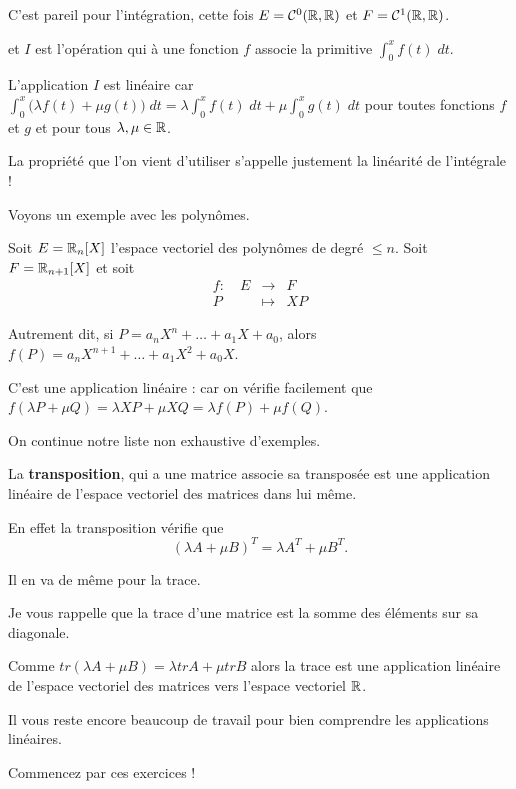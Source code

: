 \change

C'est pareil pour l'intégration, cette fois 
 $E = \mathcal{C}^0(\mathbb{R},\mathbb{R})$ et $F = \mathcal{C}^1(\mathbb{R},\mathbb{R})$. 

et $I$ est l'opération qui à une fonction $f$ associe
la primitive $\int_0^x f(t) \; dt$.


L'application $I$ est linéaire car 
$\int_0^x \big(\lambda f(t) + \mu g(t)\big) \; dt 
= \lambda \int_0^x f(t) \; dt + \mu \int_0^x g(t) \; dt$  
pour toutes fonctions $f$ et $g$ et pour tous $\lambda,\mu \in \mathbb{R}$.
 
La propriété que l'on vient d'utiliser s'appelle justement la linéarité de l'intégrale !

\change

Voyons un exemple avec les polynômes.



Soit $E=\mathbb{R}_n[X]$ l'espace vectoriel des polynômes de degré $\le n$.
Soit $F = \mathbb{R}_{n+1}[X]$ et soit 
$$\begin{array}{rcl}
f : \quad E & \longrightarrow & F \\
P & \longmapsto & X P
  \end{array}$$
  
Autrement dit, si $P = a_n X^n + \dots + a_1 X + a_0$,
alors $f(P) =  a_n X^{n+1} + \dots + a_1 X^2 + a_0 X$.

C'est une application linéaire : car on vérifie facilement que 
$f(\lambda P+ \mu Q) = \lambda X P + \mu X Q = \lambda f(P) + \mu f(Q)$.


\diapo

On continue notre liste non exhaustive d'exemples.


La \textbf{transposition}, qui a une matrice associe sa transposée est une application linéaire
de l'espace vectoriel des matrices dans lui même.

En effet la transposition vérifie que 
$$(\lambda A + \mu B)^{T}=\lambda A^{T} + \mu B^{T}.$$

\change


Il en va de même pour la trace. 

Je vous rappelle que la trace d'une matrice est la somme des éléments sur sa diagonale.

Comme $tr(\lambda A + \mu B) = \lambda tr A + \mu tr B$
alors la trace est une application linéaire de l'espace vectoriel des matrices vers l'espace vectoriel $\mathbb{R}$.



\diapo

Il vous reste encore beaucoup de travail pour bien comprendre les applications linéaires.

Commencez par ces exercices !




